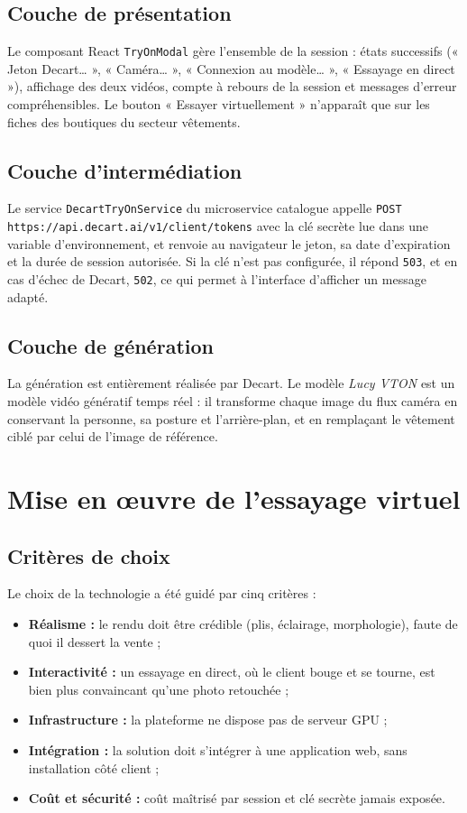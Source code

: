 \subsection{Couche de présentation}
Le composant React \texttt{TryOnModal} gère l'ensemble de la session : états successifs (« Jeton Decart… », « Caméra… », « Connexion au modèle… », « Essayage en direct »), affichage des deux vidéos, compte à rebours de la session et messages d'erreur compréhensibles. Le bouton « Essayer virtuellement » n'apparaît que sur les fiches des boutiques du secteur vêtements.

\subsection{Couche d'intermédiation}
Le service \texttt{DecartTryOnService} du microservice catalogue appelle \texttt{POST https://api.decart.ai/v1/client/tokens} avec la clé secrète lue dans une variable d'environnement, et renvoie au navigateur le jeton, sa date d'expiration et la durée de session autorisée. Si la clé n'est pas configurée, il répond \texttt{503}, et en cas d'échec de Decart, \texttt{502}, ce qui permet à l'interface d'afficher un message adapté.

\subsection{Couche de génération}
La génération est entièrement réalisée par Decart. Le modèle \textit{Lucy VTON} est un modèle vidéo génératif temps réel : il transforme chaque image du flux caméra en conservant la personne, sa posture et l'arrière-plan, et en remplaçant le vêtement ciblé par celui de l'image de référence.

\section{Mise en œuvre de l'essayage virtuel}
\subsection{Critères de choix}
Le choix de la technologie a été guidé par cinq critères :
\begin{itemize}
  \item \textbf{Réalisme :} le rendu doit être crédible (plis, éclairage, morphologie), faute de quoi il dessert la vente ;
  \item \textbf{Interactivité :} un essayage en direct, où le client bouge et se tourne, est bien plus convaincant qu'une photo retouchée ;
  \item \textbf{Infrastructure :} la plateforme ne dispose pas de serveur GPU ;
  \item \textbf{Intégration :} la solution doit s'intégrer à une application web, sans installation côté client ;
  \item \textbf{Coût et sécurité :} coût maîtrisé par session et clé secrète jamais exposée.
\end{itemize}

